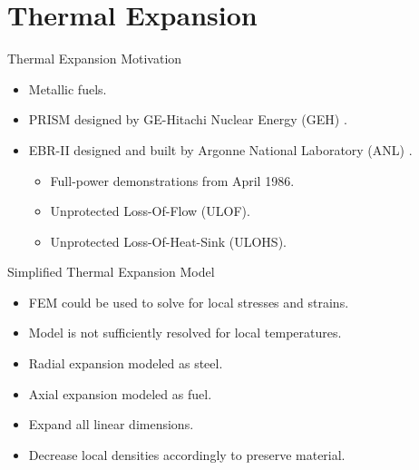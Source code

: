 \section{Thermal Expansion}
\label{sec:thermalExpansion}

\begin{frame}{Thermal Expansion Motivation}
  \begin{itemize}
    \item Metallic fuels.
    \item PRISM designed by GE-Hitachi Nuclear Energy (GEH) \cite{GEFR793}.
    \item EBR-II designed and built by Argonne National Laboratory (ANL)
      \cite{PlentifulEnergy}.
      \begin{itemize}
        \item Full-power demonstrations from April 1986.
        \item Unprotected Loss-Of-Flow (ULOF).
        \item Unprotected Loss-Of-Heat-Sink (ULOHS).
      \end{itemize}
  \end{itemize}
\end{frame}

\begin{frame}{Simplified Thermal Expansion Model}
  \begin{itemize}
    \item FEM could be used to solve for local stresses and strains.
    \item Model is not sufficiently resolved for local temperatures.
  \end{itemize}
  \begin{itemize}
    \item Radial expansion modeled as steel.
    \item Axial expansion modeled as fuel.
    \item Expand all linear dimensions.
    \item Decrease local densities accordingly to preserve material.
  \end{itemize}
\end{frame}

